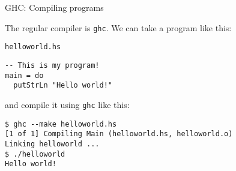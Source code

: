 %
\begin{frame}[fragile]{GHC: Compiling programs}

The regular compiler is \texttt{ghc}. We can take a program like this:

\begin{block}{\texttt{helloworld.hs}}
\begin{verbatim}
-- This is my program!
main = do
  putStrLn "Hello world!"
\end{verbatim}
\end{block}

and compile it using \texttt{ghc} like this:

\begin{block}{}
\begin{verbatim}
$ ghc --make helloworld.hs 
[1 of 1] Compiling Main (helloworld.hs, helloworld.o)
Linking helloworld ...
$ ./helloworld 
Hello world!
\end{verbatim}
\end{block}

\end{frame}
